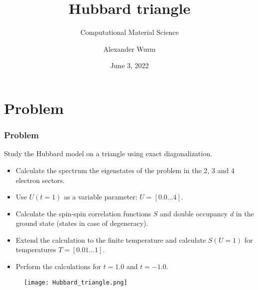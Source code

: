 \documentclass{beamer}
\title[Hubbard triangle]{Hubbard triangle}
\subtitle{Computational Material Science}
\author[A. Wurm]{Alexander Wurm}
\institute[]{Matr.Nr.: 11771212}
\date[03.06.2022]{June 3, 2022}
\begin{document}
{ 
}
\addtocounter{framenumber}{-1}

\begin{frame}
\tableofcontents

\vfill
\end{frame}


\section{Problem}
\begin{frame}\frametitle{Problem}
Study the Hubbard model on a triangle using exact diagonalization.

\begin{itemize}
	\item Calculate the spectrum the eigenstates of the problem in the 2, 3 and 4 electron sectors. 
	\item Use $U(t=1)$ as a variable parameter: $U=\left[0.0 \ldots 4\right]$. 	
	\item Calculate the spin-spin correlation functions $S$ and double occupancy $d$ in the ground state (states in case of degeneracy).	
	\item Extend the calculation to the finite temperature and calculate $S(U=1)$ for temperatures $T= \left[0.01 \ldots 1\right]$. 
	\item Perform the calculations for $t=1.0$ and $t=-1.0$.
\end{itemize}

\begin{figure}[H]
	\centering
	\texttt{[image: Hubbard\_triangle.png]}
	\label{fig:hubbardtriangle}
\end{figure}	
\end{frame}
\end{document}
